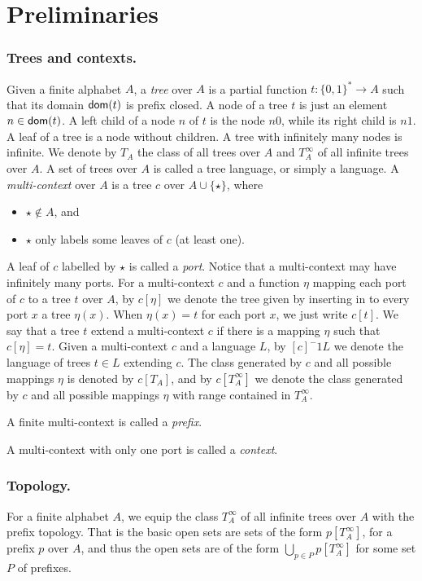 
\section{Preliminaries}
\subsubsection*{Trees and contexts.}
Given a finite alphabet $A$, a \emph{tree} over $A$ is a partial function $t: \{0,1\}^* \to A$ such that its domain $\mathsf{dom}(t)$ is prefix closed. A node of a tree $t$ is just an element $n \in \mathsf{dom}(t)$. A left child of a node $n$ of $t$ is the node $n0$, while its right child is $n1$. A leaf of a tree is a node without children. A tree  with infinitely many nodes is infinite. We denote by $T_A$ the class of all  trees over $A$ and $T^\infty_A$ of all infinite trees over $A$. A set of trees over $A$ is called a tree language, or simply a language.
A \emph{multi-context} over $A$ is a tree $c$ over $A \cup \{\star\}$, where 
\begin{itemize} 
\item $\star \notin A$, and 
\item $\star$ only labels some leaves of $c$ (at least one). 
\end{itemize}
A leaf of $c$ labelled by $\star$ is called a \emph{port}. Notice that a multi-context may have infinitely many ports. For a multi-context $c$ and a function $\eta$ mapping each port of $c$ to a tree $t$ over $A$, by $c[\eta]$ we denote the tree given by inserting in to every port $x$ a tree $\eta(x)$. When $\eta(x)=t$ for each port $x$, we just write $c[t]$.  We say that a tree $t$ extend a multi-context $c$ if there is a mapping $\eta$ such that $c[\eta]=t$. Given a multi-context $c$ and a language $L$, by $[c]^-1L$ we denote the language of trees $t\in L$ extending $c$.
 The class generated by $c$ and all possible mappings $\eta$ is denoted by $c[T_A]$, and by $c[T^\infty_A]$ we denote the class generated by $c$ and all possible mappings $\eta$ with range contained in $T_A^\infty$. 

A finite multi-context is called a \emph{prefix}.

A multi-context with only one port is called a \emph{context}. %




\subsubsection*{Topology.}
For a finite alphabet $A$, we equip the class $T^\infty_A$ of all infinite trees over $A$ with the prefix topology. That is the basic open sets are sets of the form $p[T^\infty_A]$, for a prefix $p$ over $A$, and thus the open sets are of the form $\bigcup_{p \in P}p[T^\infty_A]$ for some set $P$ of prefixes. 

